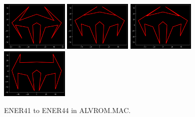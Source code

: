 \begin{figure}[H]
  {
        \includegraphics[width=3.22cm]{src/tempest_unused/ENER41.png}%
        \hspace{-0.2cm}
        \includegraphics[width=3.22cm]{src/tempest_unused/ENER42.png}%
        \hspace{-0.2cm}
        \includegraphics[width=3.22cm]{src/tempest_unused/ENER43.png}%
        \hspace{-0.2cm}
        \includegraphics[width=3.22cm]{src/tempest_unused/ENER44.png}%
        \vspace{-0.2cm}
  }\caption*{ENER41 to ENER44 in ALVROM.MAC.}
\end{figure}

